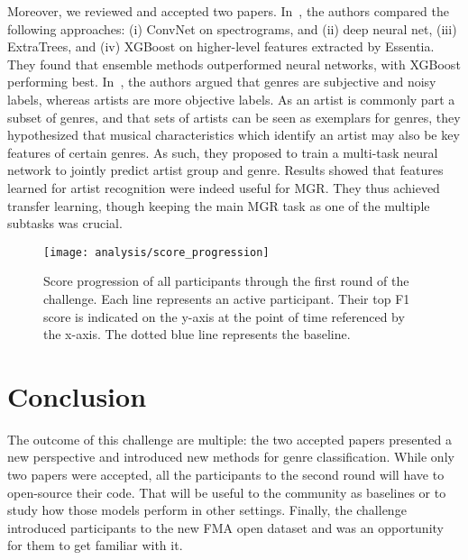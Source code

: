 \documentclass[sigconf]{acmart}
\begin{document}
Moreover, we reviewed and accepted two papers.
%
In~\cite{gradient_boosting}, the authors compared the following approaches: (i) ConvNet on spectrograms, and (ii) deep neural net, (iii) ExtraTrees, and (iv) XGBoost on higher-level features extracted by Essentia. They found that ensemble methods outperformed neural networks, with XGBoost performing best.
%
In~\cite{transfer_learning}, the authors argued that genres are subjective and noisy labels, whereas artists are more objective labels.
As an artist is commonly part a subset of genres, and that sets of artists can be seen as exemplars for genres, they hypothesized that musical characteristics which identify an artist may also be key features of certain genres.
As such, they proposed to train a multi-task neural network to jointly predict artist group and genre. Results showed that features learned for artist recognition were indeed useful for MGR.
They thus achieved transfer learning, though keeping the main MGR task as one of the multiple subtasks was crucial.


\begin{figure}[t]
\centering
\texttt{[image: analysis/score\_progression]}
\caption{Score progression of all participants through the first round of the challenge. Each line represents an active participant. Their top F1 score is indicated on the y-axis at the point of time referenced by the x-axis. The dotted blue line represents the baseline.}
\label{fig:timeline}
\end{figure}

\section{Conclusion}

The outcome of this challenge are multiple: the two accepted papers presented a new perspective and introduced new methods for genre classification. While only two papers were accepted, all the participants to the second round will have to open-source their code. That will be useful to the community as baselines or to study how those models perform in other settings. Finally, the challenge introduced participants to the new FMA open dataset and was an opportunity for them to get familiar with it.
\end{document}
